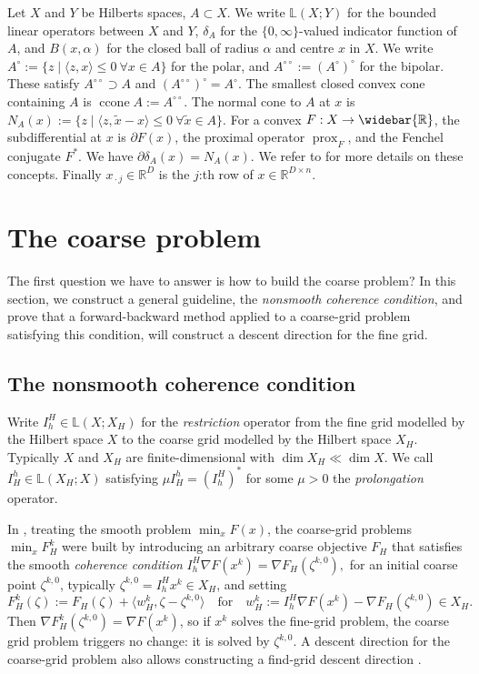 \documentclass[a4paper,english]{jnsao}
\theoremstyle{definition}
\numberwithin{algorithm}{section}
\DeclareMathOperator{\prox}{prox}
\def\grad{\nabla}
\def\linear{\mathbb{L}}
\def\term#1{\emph{#1}}
\def\iprod#1#2{\langle #1, #2 \rangle}
\def\defeq{:=}
\def\R{\mathbb{R}}
\def\extR{\widebar{\R}}
\DeclareMathOperator{\ccone}{ccone}
\newcommand{\freevar}{\,\boldsymbol\cdot\,}
\def\polar#1{#1^\circ}
\def\bipolar#1{#1^{\circ\circ}}
\begin{document}
Let $X$ and $Y$ be Hilberts spaces, $A \subset X$.
We write $\linear(X; Y)$ for the bounded linear operators between $X$ and $Y$, $\delta_A$ for the $\{0,\infty\}$-valued indicator function of $A$, and
$B(x,\alpha)$ for the closed ball of radius $\alpha$ and centre $x$ in $X$.
We write $\polar A \defeq \{ z \mid \iprod{z}{x} \le 0\ \forall x \in A\}$ for the polar, and $\bipolar A \defeq \polar{(\polar A)}$ for the bipolar.
These satisfy $\bipolar A \supset A$ and $\polar{(\bipolar A)} = \polar A$.
The smallest closed convex cone containing $A$ is $\ccone A \defeq \bipolar A$.
The normal cone to $A$ at $x$ is $N_A(x) \defeq \{ z \mid \iprod{z}{\tilde x - x} \le 0 \ \forall \tilde x \in A\}$.
For a convex $F: X \to \extR$, the subdifferential at $x$ is $\partial F(x)$, the proximal operator $\prox_F$, and the Fenchel conjugate $F^*$.
We have $\partial \delta_A(x) = N_A(x)$.
We refer to \cite{clason2020introduction} for more details on these concepts.
Finally $x_{\freevar j} \in \R^D$ is the $j$:th row of $x \in \R^{D \times n}$.

\section{The coarse problem}
\label{sec:nscc}

The first question we have to answer is how to build the coarse problem?
In this section, we construct a general guideline, the \emph{nonsmooth coherence condition}, and prove that a forward-backward method applied to a coarse-grid problem satisfying this condition, will construct a descent direction for the fine grid.

\subsection{The nonsmooth coherence condition}

Write $I_h^H \in \linear(X; X_H)$ for the \term{restriction} operator from the fine grid modelled by the Hilbert space $X$ to the coarse grid modelled by the Hilbert space $X_H$. Typically $X$ and $X_H$ are finite-dimensional with $\dim X_H \ll \dim X$.
We call $I_H^h \in \linear(X_H; X)$ satisfying $\mu I_H^h=(I_h^H)^*$ for some $\mu>0$ the \term{prolongation} operator.

In \cite{nash2000multigrid,parpas2017multilevel}, treating the smooth problem $\min_x F(x)$, the coarse-grid problems $\min_x F_H^k$ were built by introducing an arbitrary coarse objective $F_H$ that satisfies the smooth \term{coherence condition}
$
    I_h^H \nabla F(x^{k}) = \nabla F_H(\zeta ^{k,0}),
$
for an initial coarse point $\zeta^{k,0}$, typically $\zeta^{k,0}=I_h^H x^k \in X_H$, and setting
\[
    F_H^k(\zeta) \defeq F_H(\zeta) + \iprod{w_H^k}{\zeta-\zeta^{k,0}}
    \quad\text{for}\quad
    w_H^k \defeq I_h^H \grad F(x^k) - \grad F_H(\zeta^{k,0}) \in X_H.
\]
Then $\grad F_H^k(\zeta^{k,0})=\grad F(x^k)$, so if $x^k$ solves the fine-grid problem, the coarse grid problem triggers no change: it is solved by $\zeta^{k,0}$.
A descent direction for the coarse-grid problem also allows constructing a find-grid descent direction \cite{nash2000multigrid}.
\end{document}
